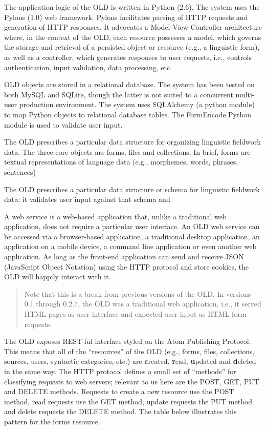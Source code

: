 \documentclass[letterpaper,10pt,english]{sphinxmanual}
\begin{document}
The application logic of the OLD is written in Python (2.6).  The system uses
the Pylons (1.0) web framework.  Pylons facilitates parsing of HTTP requests and
generation of HTTP responses.  It advocates a Model-View-Controller architecture
where, in the context of the OLD, each resource possesses a model, which governs
the storage and retrieval of a persisted object or resource (e.g., a linguistic
form), as well as a controller, which generates responses to user requests, i.e.,
controls authentication, input validation, data processing, etc.

OLD objects are stored in a relational database.  The system has been tested on
both MySQL and SQLite, though the latter is not suited to a concurrent multi-
user production environment.  The system uses SQLAlchemy (a python module) to
map Python objects to relational database tables.  The FormEncode Python module
is used to validate user input.

The OLD prescribes a particular data structure for organizing linguistic
fieldwork data.  The three core objects are forms, files and collections.  In
brief, forms are textual representations of language data (e.g., morphemes,
words, phrases, sentences)

The OLD prescribes a particular
data structure or schema for linguistic fieldwork data; it validates user input
against that schema and

A web service is a web-based application
that, unlike a traditional web application, does not require a particular user
interface.  An OLD web service can be accessed via a browser-based application,
a traditional desktop application, an application on a mobile device, a command
line application or even another web application.  As long as the front-end
application can send and receive JSON (JavaScript Object Notation) using the
HTTP protocol and store cookies, the OLD will happily interact with it.
\begin{quote}

Note that this is a break from previous versions of the OLD.  In versions 0.1
through 0.2.7, the OLD was a traditional web application, i.e., it served HTML
pages as user interface and expected user input as HTML form requests.
\end{quote}

The OLD exposes REST-ful interface styled on the Atom Publishing Protocol.  This
means that all of the ``resources'' of the OLD (e.g., forms, files, collections,
sources, users, syntactic categories, etc.) are \textbf{c}reated, \textbf{r}ead,
\textbf{u}pdated and \textbf{d}eleted in the same way.  The HTTP protocol defines a
small set of ``methods'' for classifying requests to web servers; relevant to us
here are the POST, GET, PUT and DELETE methods.  Requests to create a new
resource use the POST method, read requests use the GET method, update requests
the PUT method and delete requests the DELETE method.  The table below
illustrates this pattern for the forms resource.
\end{document}
